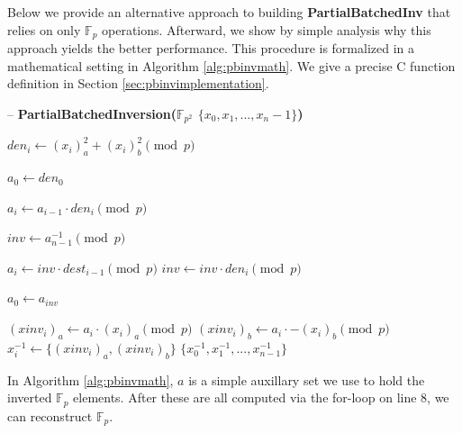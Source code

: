 Below we provide an alternative approach to building \textbf{PartialBatchedInv} that relies on only $\mathbb{F}_{p}$ operations. Afterward, we show by simple analysis why this approach yields the better performance. This procedure is formalized in a mathematical setting in Algorithm \ref{alg:pbinvmath}. We give a precise C function definition in Section \ref{sec:pbinvimplementation}.

\begin{algorithm}
\caption{-- \textbf{PartialBatchedInversion($\mathbb{F}_{p^{2}}$ $\{x_0, x_1, ..., x_n-1\}$)}}\label{alg:pbinvmath}
\begin{algorithmic}[1]
	\State $den_{i} \gets (x_i)_{a}^{2} + (x_i)_{b}^{2} \pmod{p}$
\EndFor

\State $a_0 \gets den_0$

	\State $a_i \gets a_{i-1} \cdot den_i \pmod{p}$
\EndFor

\State $inv \gets a_{n-1}^{-1} \pmod{p}$

	\State $a_i \gets inv \cdot dest_{i-1} \pmod{p}$
	\State $inv \gets inv \cdot den_i \pmod{p}$
\EndFor

\State $a_0 \gets a_{inv}$

	\State $(xinv_i)_a \gets a_i \cdot (x_i)_a \pmod{p}$
	\State $(xinv_i)_b \gets a_i \cdot -(x_i)_b \pmod{p}$
	\State $x_i^{-1} \gets \{(xinv_i)_a, (xinv_i)_b\}$
\EndFor
\State \Return $\{x_0^{-1}, x_1^{-1}, ..., x_{n-1}^{-1}\}$
\end{algorithmic}
\end{algorithm}
\noindent

In Algorithm \ref{alg:pbinvmath}, $a$ is a simple auxillary set we use to hold the inverted $\mathbb{F}_{p}$ elements. After these are all computed via the for-loop on line 8, we can reconstruct $\mathbb{F}_{p}$.

